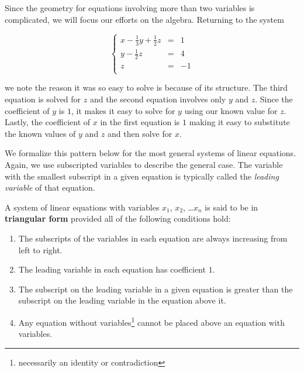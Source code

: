 \documentclass{ximera}
\begin{document}
\begin{center}
\end{center}

Since the geometry for equations involving more than two variables is complicated, we will focus our efforts on the algebra.  Returning to the system 

\[ \left\{ \begin{array}{rcr} x-\frac{1}{3}y+\frac{1}{2}z  & = & 1 \\  
y - \frac{1}{2} z & = & 4 \\  
z & = & -1 \\ \end{array} \right.\] 

we note the reason it was so easy to solve is because of its structure.  The third equation is solved for $z$ and the second equation involves only $y$ and $z$. Since the coefficient of $y$ is $1$, it makes it easy to solve for $y$ using our known value for $z$.  Lastly, the coefficient of  $x$ in the first equation is $1$ making it easy to substitute the known values of $y$ and $z$ and then solve for $x$.  

We formalize this pattern below for the most general systems of linear equations.  Again, we use subscripted variables to describe the general case.  The variable with the smallest subscript in a given equation is typically called the  \textit{leading variable} of that equation.

 

\begin{definition} \label{systemtriangularform} A system of linear equations with variables $x_1$, $x_2$, \ldots $x_{n}$ is said to be in   \textbf{triangular form} provided all of the following conditions hold:

\begin{enumerate}

\item  The subscripts of the variables in each equation are always increasing from left to right.

\item  The leading variable in each equation has coefficient $1$.

\item  The subscript on the leading variable in a given equation is greater than the subscript on the leading variable in the equation above it.

\item  Any equation without variables\footnote{necessarily an identity or contradiction} cannot be placed above an equation with variables.

\end{enumerate}

\end{definition}
\end{document}
